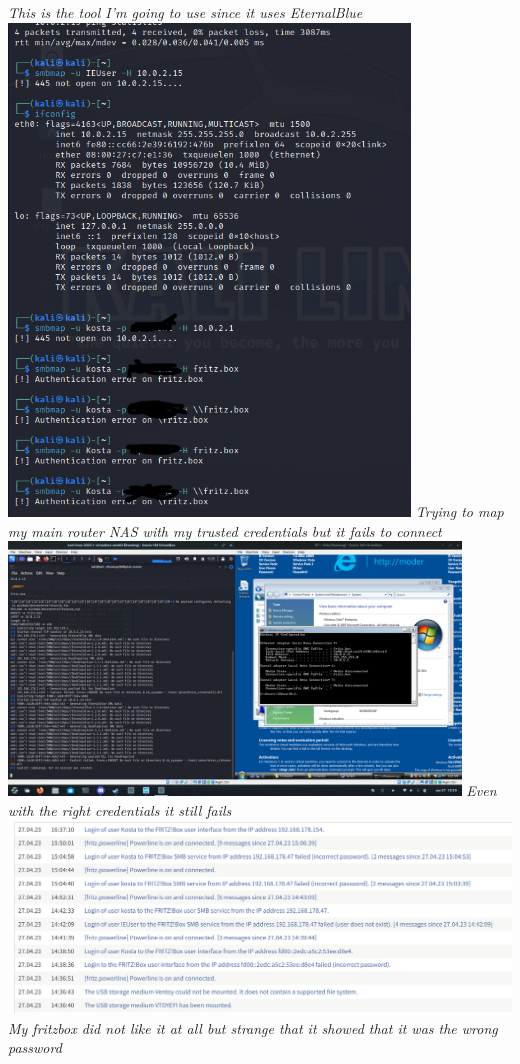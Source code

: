 \documentclass[12pt, letterpaper]{article}
\begin{document}
\break
\emph{This is the tool I'm going to use since it uses EternalBlue}
\hfill\break
\hfill\break
\includegraphics[width=0.8\textwidth]{fotos/PVI/Windows Vista/auth issue smbmap.png}
\break
\emph{Trying to map my main router NAS with my trusted credentials but it fails to connect}
\hfill\break
\hfill\break
\includegraphics[width=0.9\textwidth]{fotos/PVI/Windows Vista/smbploit failed.png}
\break
\emph{Even with the right credentials it still fails}
\hfill\break
\hfill\break
\includegraphics[width=1\textwidth]{fotos/PVI/Fritzbox/Logs.jpeg}
\break
\emph{My fritzbox did not like it at all but strange that it showed that it was the wrong password}
\end{document}
